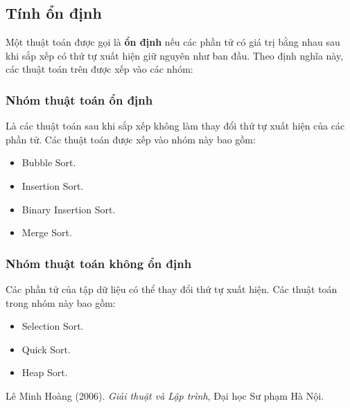 \documentclass[]{article}
\begin{document}
\subsection{Tính ổn định}
Một thuật toán được gọi là \textbf{ổn định} nếu các phần tử có giá trị bằng nhau sau khi sắp xếp có thứ tự xuất hiện giữ nguyên như ban đầu. Theo định nghĩa này, các thuật toán trên được xếp vào các nhóm:

\subsubsection{Nhóm thuật toán ổn định}
Là các thuật toán sau khi sắp xếp không làm thay đổi thứ tự xuất hiện của các phần tử. Các thuật toán được xếp vào nhóm này bao gồm:
\begin{itemize}
\item Bubble Sort.
\item Insertion Sort.
\item Binary Insertion Sort.
\item Merge Sort.
\end{itemize}

\subsubsection{Nhóm thuật toán không ổn định}
Các phần tử của tập dữ liệu có thể thay đổi thứ tự xuất hiện. Các thuật toán trong nhóm này bao gồm:
\begin{itemize}
\item Selection Sort.
\item Quick Sort.
\item Heap Sort.
\end{itemize}

\medskip

\begin{thebibliography}{10}
Lê Minh Hoàng (2006).
\textit{Giải thuật và Lập trình}, Đại học Sư phạm Hà Nội.
\end{thebibliography}
\end{document}
